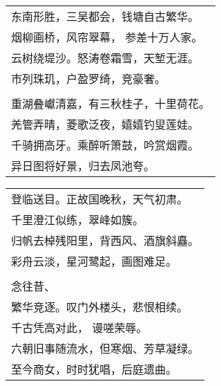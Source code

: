 \noindent\begin{minipage}{\linewidth}
  \vskip-3pt\begin{table}[H]
    \centering
    \begin{tabular}{@{}l@{}}
东南形胜，三吴都会，钱塘自古繁华。\\
烟柳画桥，风帘翠幕， 参差十万人家。\\
云树绕堤沙。怒涛卷霜雪，天堑无涯。\\
市列珠玑，户盈罗绮，竞豪奢。\\
\\
重湖叠巘清嘉，有三秋桂子，十里荷花。\\
羌管弄晴，菱歌泛夜，嬉嬉钓叟莲娃。\\
千骑拥高牙。乘醉听箫鼓，吟赏烟霞。\\
异日图将好景，归去凤池夸。
    \end{tabular}
  \end{table}
\end{minipage}
\vspace{1cm}


\noindent\begin{minipage}{\linewidth}
  \vskip-3pt\begin{table}[H]
    \centering
    \begin{tabular}{@{}l@{}}
登临送目。正故国晚秋，天气初肃。\\
千里澄江似练，翠峰如簇。\\
归帆去棹残阳里，背西风、酒旗斜矗。\\
彩舟云淡，星河鹭起，画图难足。\\
\\
念往昔、\\
繁华竞逐。叹门外楼头，悲恨相续。\\
千古凭高对此， 谩嗟荣辱。\\
六朝旧事随流水，但寒烟、芳草凝绿。\\
至今商女，时时犹唱，后庭遗曲。
    \end{tabular}
  \end{table}
\end{minipage}
\vspace{1cm}


